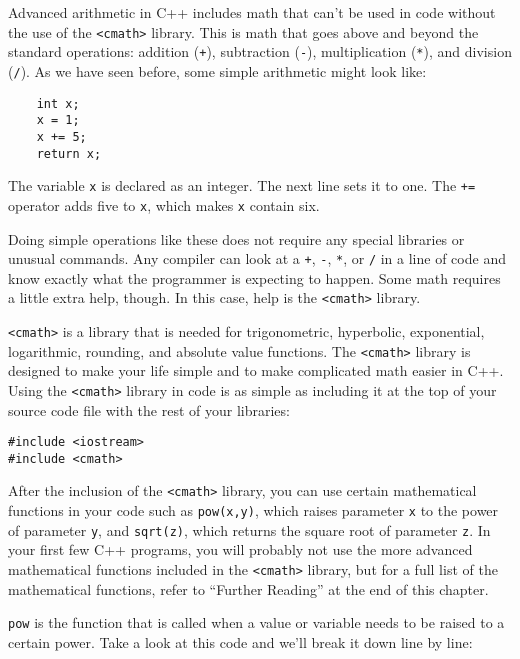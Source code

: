 Advanced arithmetic in C++ includes math that can't be used in code without the use of the \texttt{<cmath>} library. 
This is math that goes above and beyond the standard operations: addition (\texttt{+}), subtraction (\texttt{-}), multiplication (\texttt{*}), and division (\texttt{/}). 
As we have seen before, some simple arithmetic might look like:
	
\begin{lstlisting}
	int x;
	x = 1;
	x += 5;
	return x;
\end{lstlisting}
	The variable \texttt{x} is declared as an integer. 
	The next line sets it to one. 
	The \texttt{+=} operator adds five to \texttt{x}, which makes \texttt{x} contain six.
	
	Doing simple operations like these does not require any special libraries or unusual commands.
	 Any compiler can look at a \texttt{+}, \texttt{-}, \texttt{*}, or \texttt{/} in a line of code and know exactly what the programmer is expecting to happen. 
	 Some math requires a little extra help, though. In this case, help is the \texttt{<cmath>} library.
	 
	\texttt{<cmath>} is a library that is needed for trigonometric, hyperbolic, exponential, logarithmic, rounding, and absolute value functions. 
	The \texttt{<cmath>} library is designed to make your life simple and to make complicated math easier in C++. 
	Using the \texttt{<cmath>} library in code is as simple as including it at the top of your source code file with the rest of your libraries:

\begin{lstlisting}
#include <iostream>	
#include <cmath>
\end{lstlisting}

	After the inclusion of the \texttt{<cmath>} library, you can use certain mathematical functions in your code such as \texttt{pow(x,y)}, which raises parameter \texttt{x} to the power of parameter \texttt{y}, and \texttt{sqrt(z)}, which returns the square root of parameter \texttt{z}. 
	In your first few C++ programs, you will probably not use the more advanced mathematical functions included in the \texttt{<cmath>} library, but for a full list of the mathematical functions, refer to ``Further Reading'' at the end of this chapter. 


	\texttt{pow} is the function that is called when a value or variable needs to be raised to a certain power. Take a look at this code and we'll break it down line by line:

